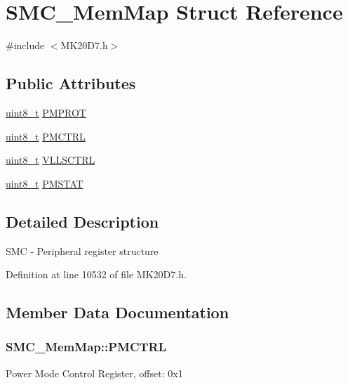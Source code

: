 \hypertarget{struct_s_m_c___mem_map}{}\section{S\+M\+C\+\_\+\+Mem\+Map Struct Reference}
\label{struct_s_m_c___mem_map}


{\ttfamily \#include $<$M\+K20\+D7.\+h$>$}

\subsection*{Public Attributes}
\begin{DoxyCompactItemize}
\item 
\hyperlink{_p_e___types_8h_aba7bc1797add20fe3efdf37ced1182c5}{uint8\+\_\+t} \hyperlink{struct_s_m_c___mem_map_afd03d93a7823dc65f53216dca15a2a95}{P\+M\+P\+R\+OT}
\item 
\hyperlink{_p_e___types_8h_aba7bc1797add20fe3efdf37ced1182c5}{uint8\+\_\+t} \hyperlink{struct_s_m_c___mem_map_a2a5d946bb55640fd179c4065937bea5c}{P\+M\+C\+T\+RL}
\item 
\hyperlink{_p_e___types_8h_aba7bc1797add20fe3efdf37ced1182c5}{uint8\+\_\+t} \hyperlink{struct_s_m_c___mem_map_ad5b37041739800b7bb7afc59d53c7ded}{V\+L\+L\+S\+C\+T\+RL}
\item 
\hyperlink{_p_e___types_8h_aba7bc1797add20fe3efdf37ced1182c5}{uint8\+\_\+t} \hyperlink{struct_s_m_c___mem_map_a0fddef87e229c4cf1b3be0d29589e964}{P\+M\+S\+T\+AT}
\end{DoxyCompactItemize}


\subsection{Detailed Description}
S\+MC -\/ Peripheral register structure 

Definition at line 10532 of file M\+K20\+D7.\+h.



\subsection{Member Data Documentation}
\subsubsection[{\texorpdfstring{P\+M\+C\+T\+RL}{PMCTRL}}]{ S\+M\+C\+\_\+\+Mem\+Map\+::\+P\+M\+C\+T\+RL}\hypertarget{struct_s_m_c___mem_map_a2a5d946bb55640fd179c4065937bea5c}{}\label{struct_s_m_c___mem_map_a2a5d946bb55640fd179c4065937bea5c}
Power Mode Control Register, offset\+: 0x1 


